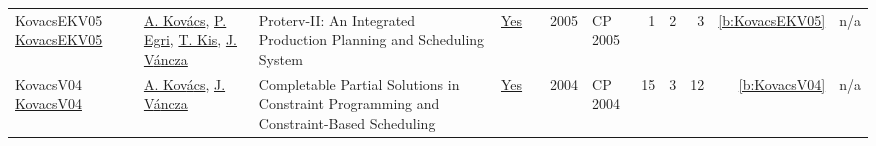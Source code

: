 {\begin{longtable}{>{\raggedright\arraybackslash}p{3cm}>{\raggedright\arraybackslash}p{6cm}>{\raggedright\arraybackslash}p{6.5cm}rrrp{2.5cm}rrrrr}
KovacsEKV05 \href{https://doi.org/10.1007/11564751_118}{KovacsEKV05} & \hyperref[auth:a147]{A. Kov{\'{a}}cs}, \hyperref[auth:a279]{P. Egri}, \hyperref[auth:a156]{T. Kis}, \hyperref[auth:a280]{J. V{\'{a}}ncza} & Proterv-II: An Integrated Production Planning and Scheduling System & \href{../works/KovacsEKV05.pdf}{Yes} & \cite{KovacsEKV05} & 2005 & CP 2005 & 1 & 2 & 3 & \ref{b:KovacsEKV05} & n/a\\
KovacsV04 \href{https://doi.org/10.1007/978-3-540-30201-8_26}{KovacsV04} & \hyperref[auth:a147]{A. Kov{\'{a}}cs}, \hyperref[auth:a280]{J. V{\'{a}}ncza} & Completable Partial Solutions in Constraint Programming and Constraint-Based Scheduling & \href{../works/KovacsV04.pdf}{Yes} & \cite{KovacsV04} & 2004 & CP 2004 & 15 & 3 & 12 & \ref{b:KovacsV04} & n/a\\
\end{longtable}
}

\clearpage
